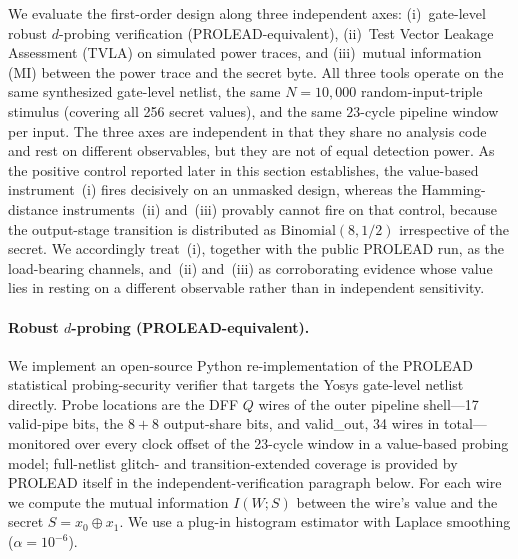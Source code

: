 \documentclass[lettersize,journal]{IEEEtran}
\begin{document}
We evaluate the first-order design along three independent axes: (i)~gate-level
robust $d$-probing verification (PROLEAD-equivalent), (ii)~Test Vector
Leakage Assessment (TVLA) on simulated power traces, and (iii)~mutual
information (MI) between the power trace and the secret byte.  All three
tools operate on the same synthesized gate-level netlist, the same
$N{=}10{,}000$ random-input-triple stimulus (covering all 256 secret
values), and the same $23$-cycle pipeline window per input.  The three
axes are independent in that they share no analysis code and rest on
different observables, but they are not of equal detection power.  As
the positive control reported later in this section establishes, the
value-based instrument~(i) fires decisively on an unmasked design,
whereas the Hamming-distance instruments~(ii) and~(iii) provably
cannot fire on that control, because the output-stage transition is
distributed as $\mathrm{Binomial}(8,1/2)$ irrespective of the secret.
We accordingly treat~(i), together with the public PROLEAD run, as the
load-bearing channels, and~(ii) and~(iii) as corroborating evidence
whose value lies in resting on a different observable rather than in
independent sensitivity.

\paragraph{Robust $d$-probing (PROLEAD-equivalent).}
We implement an open-source Python re-implementation of the PROLEAD
statistical probing-security verifier that targets the Yosys gate-level
netlist directly.  Probe locations are the DFF $Q$ wires of the outer
pipeline shell---17 valid-pipe bits, the $8{+}8$ output-share bits, and
valid\_out, 34 wires in total---monitored over every clock offset of the
23-cycle window in a value-based probing model; full-netlist glitch-
and transition-extended coverage is provided by PROLEAD itself in the
independent-verification paragraph below.  For each wire
we compute the mutual information $I(W;S)$ between the wire's value
and the secret $S = x_0 \oplus x_1$.  We use a plug-in
histogram estimator with Laplace smoothing ($\alpha = 10^{-6}$).
\end{document}
